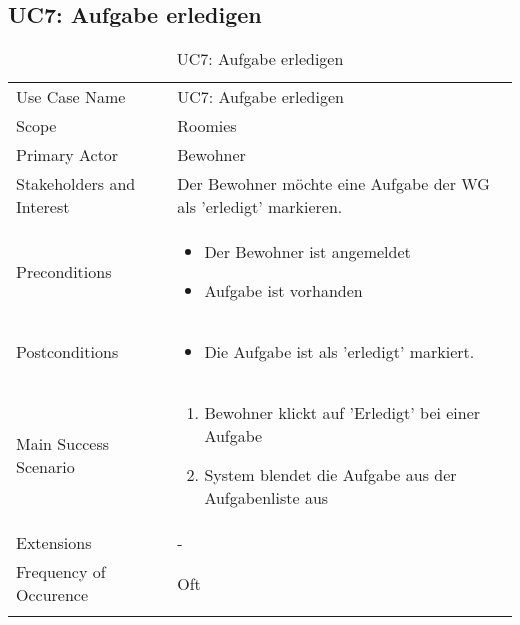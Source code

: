 \subsection{UC7: Aufgabe erledigen}
\begin{table}[H]
	\tablestyle
	\tablealtcolored
	\begin{tabularx}{\textwidth}{lX}
		\tablebody
			Use Case Name &
			UC7: Aufgabe erledigen
			\tabularnewline
			Scope &
			Roomies
			\tabularnewline
			Primary Actor &
			Bewohner
			\tabularnewline
			Stakeholders and Interest &
			Der Bewohner möchte eine Aufgabe der WG als 'erledigt' markieren.
			\tabularnewline
			Preconditions &
			\begin{itemize}
				\item Der Bewohner ist angemeldet
				\item Aufgabe ist vorhanden
			\end{itemize}
			\tabularnewline
			Postconditions &
			\begin{itemize}
				\item Die Aufgabe ist als 'erledigt' markiert.
			\end{itemize}
			\tabularnewline
			Main Success Scenario &
			\begin{enumerate}
				\item Bewohner klickt auf 'Erledigt' bei einer Aufgabe
				\item System blendet die Aufgabe aus der Aufgabenliste aus
			\end{enumerate}
			\tabularnewline
			Extensions &
			-
			\tabularnewline
			Frequency of Occurence &
			Oft
			\tabularnewline
		\tableend
	\end{tabularx}
	\caption{UC7: Aufgabe erledigen}
\end{table}


